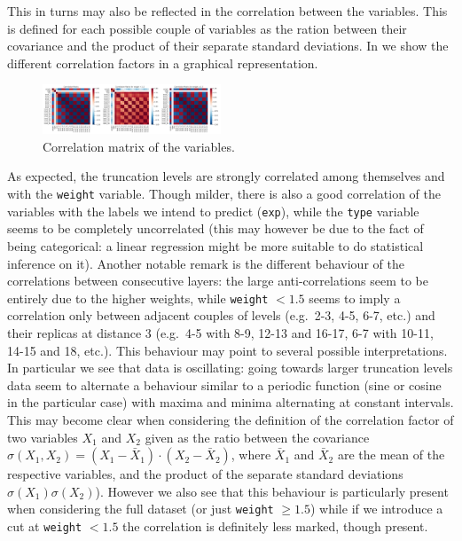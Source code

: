 This in turns may also be reflected in the correlation between the variables.
This is defined for each possible couple of variables as the ration between
their covariance and the product of their separate standard deviations.
In  we show the different correlation factors in a graphical
representation.
\begin{figure}[htbp]
  \centering
  \includegraphics[width=0.475\textwidth]{img/corr-mat}
  \caption{Correlation matrix of the variables.}
  \label{fig:eda:corr}
\end{figure}
As expected, the truncation levels are strongly correlated among themselves and
with the \texttt{weight} variable.
Though milder, there is also a good correlation of the variables with the
labels we intend to predict (\texttt{exp}), while the \texttt{type} variable
seems to be completely uncorrelated (this may however be due to the fact of
being categorical: a linear regression might be more suitable to do statistical
inference on it).
Another notable remark is the different behaviour of the correlations between
consecutive layers: the large anti-correlations seem to be entirely due to the
higher weights, while \texttt{weight} $< 1.5$ seems to imply a correlation only
between adjacent couples of levels (e.g.\ 2-3, 4-5, 6-7, etc.) and their
replicas at distance 3 (e.g.\ 4-5 with 8-9, 12-13 and 16-17, 6-7 with 10-11,
14-15 and 18, etc.).
This behaviour may point to several possible interpretations.
In particular we see that data is oscillating: going towards larger truncation
levels data seem to alternate a behaviour similar to a periodic function
(sine or cosine in the particular case) with maxima and minima alternating at
constant intervals.
This may become clear when considering the definition of the correlation factor
of two variables $X_1$ and $X_2$ given as the ratio between the covariance
$\sigma(X_1,X_2) = (X_1 - \bar{X}_1) \cdot (X_2 - \bar{X}_2)$, where
$\bar{X}_1$ and $\bar{X}_2$ are the mean of the respective variables, and the
product of the separate standard deviations $\sigma(X_1) \sigma(X_2)$).
However we also see that this behaviour is particularly present when
considering the full dataset (or just \texttt{weight} $\ge 1.5$) while if we
introduce a cut at \texttt{weight} $< 1.5$ the correlation is definitely less
marked, though present.

